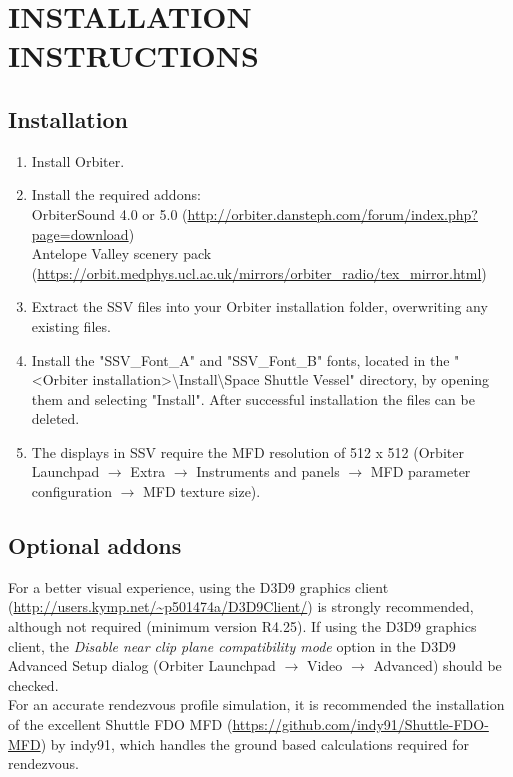 \documentclass[Space_Shuttle_Vessel_Manual.tex]{subfiles}
\begin{document}
\section{INSTALLATION INSTRUCTIONS}
\begin{multicols*}{2}

\subsection{Installation}
\noindent
\begin{enumerate}
\item Install Orbiter.

\item Install the required addons:\\
OrbiterSound 4.0 or 5.0 (\url{http://orbiter.dansteph.com/forum/index.php?page=download})\\
Antelope Valley scenery pack (\url{https://orbit.medphys.ucl.ac.uk/mirrors/orbiter_radio/tex_mirror.html})

\item Extract the SSV files into your Orbiter installation folder, overwriting any existing files.\\

\item Install the "SSV\_Font\_A" and "SSV\_Font\_B" fonts, located in the "<Orbiter installation>\textbackslash Install\textbackslash Space Shuttle Vessel" directory, by opening them and selecting "Install". After successful installation the files can be deleted.

\item The displays in SSV require the MFD resolution of 512 x 512 (Orbiter Launchpad $\rightarrow$ Extra $\rightarrow$ Instruments and panels $\rightarrow$ MFD parameter configuration $\rightarrow$ MFD texture size).
\end{enumerate}


\subsection{Optional addons}
For a better visual experience, using the D3D9 graphics client (\url{http://users.kymp.net/~p501474a/D3D9Client/}) is strongly recommended, although not required (minimum version R4.25). If using the D3D9 graphics client, the \textit{Disable near clip plane compatibility mode} option in the D3D9 Advanced Setup dialog (Orbiter Launchpad $\rightarrow$ Video $\rightarrow$ Advanced) should be checked.\\
For an accurate rendezvous profile simulation, it is recommended the installation of the excellent Shuttle FDO MFD (\url{https://github.com/indy91/Shuttle-FDO-MFD}) by indy91, which handles the ground based calculations required for rendezvous.\\
\end{multicols*}
\end{document}
